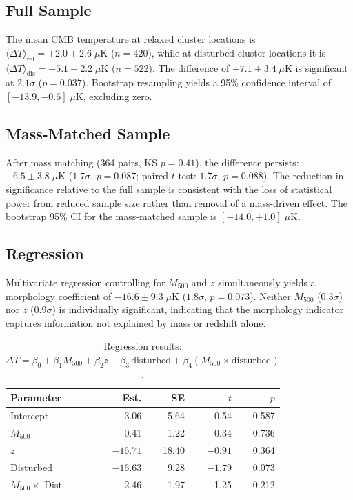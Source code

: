 \documentclass[twocolumn]{article}
\begin{document}
\subsection{Full Sample}

The mean CMB temperature at relaxed cluster locations is
$\langle\Delta T\rangle_{\mathrm{rel}} = +2.0 \pm 2.6\;\mu$K
($n = 420$), while at disturbed cluster locations it is
$\langle\Delta T\rangle_{\mathrm{dis}} = -5.1 \pm 2.2\;\mu$K
($n = 522$).
The difference of $-7.1 \pm 3.4\;\mu$K is significant at $2.1\sigma$
($p = 0.037$).
Bootstrap resampling yields a 95\% confidence interval of
$[-13.9, -0.6]\;\mu$K, excluding zero.

\subsection{Mass-Matched Sample}

After mass matching (364 pairs, KS $p = 0.41$), the difference
persists: $-6.5 \pm 3.8\;\mu$K ($1.7\sigma$, $p = 0.087$;
paired $t$-test: $1.7\sigma$, $p = 0.088$).
The reduction in significance relative to the full sample is
consistent with the loss of statistical power from reduced sample
size rather than removal of a mass-driven effect.
The bootstrap 95\% CI for the mass-matched sample is
$[-14.0, +1.0]\;\mu$K.

\subsection{Regression}

Multivariate regression controlling for $M_{500}$ and $z$
simultaneously yields a morphology coefficient of
$-16.6 \pm 9.3\;\mu$K ($1.8\sigma$, $p = 0.073$).
Neither $M_{500}$ ($0.3\sigma$) nor $z$ ($0.9\sigma$) is
individually significant, indicating that the morphology indicator
captures information not explained by mass or redshift alone.

\begin{table}[h]
\centering
\caption{Regression results: $\Delta T = \beta_0 + \beta_1 M_{500}
+ \beta_2 z + \beta_3\,\mathrm{disturbed} +
\beta_4 (M_{500} \times \mathrm{disturbed})$.}
\label{tab:regression}
\begin{tabular}{lrrrr}
\toprule
Parameter & Est. & SE & $t$ & $p$ \\
\midrule
Intercept & 3.06 & 5.64 & 0.54 & 0.587 \\
$M_{500}$ & 0.41 & 1.22 & 0.34 & 0.736 \\
$z$ & $-16.71$ & 18.40 & $-0.91$ & 0.364 \\
Disturbed & $-16.63$ & 9.28 & $-1.79$ & 0.073 \\
$M_{500} \times$ Dist. & 2.46 & 1.97 & 1.25 & 0.212 \\
\bottomrule
\end{tabular}
\end{table}
\end{document}
